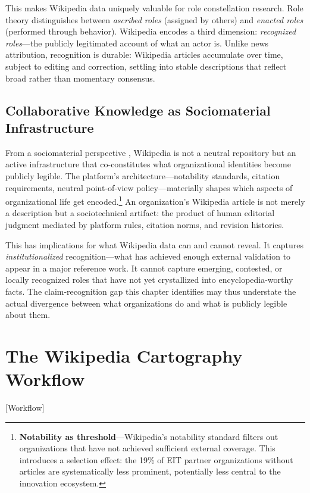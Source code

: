 \documentclass[../main.tex]{subfiles}
\begin{document}
This makes Wikipedia data uniquely valuable for role constellation research. Role theory distinguishes between \emph{ascribed roles} (assigned by others) and \emph{enacted roles} (performed through behavior). Wikipedia encodes a third dimension: \emph{recognized roles}---the publicly legitimated account of what an actor is. Unlike news attribution, recognition is durable: Wikipedia articles accumulate over time, subject to editing and correction, settling into stable descriptions that reflect broad rather than momentary consensus.

\subsection{Collaborative Knowledge as Sociomaterial Infrastructure}

From a sociomaterial perspective \parencite{orlikowski2008sociomateriality}, Wikipedia is not a neutral repository but an active infrastructure that co-constitutes what organizational identities become publicly legible. The platform's architecture---notability standards, citation requirements, neutral point-of-view policy---materially shapes which aspects of organizational life get encoded.\footnote{\textbf{Notability as threshold}---Wikipedia's notability standard filters out organizations that have not achieved sufficient external coverage. This introduces a selection effect: the 19\% of EIT partner organizations without articles are systematically less prominent, potentially less central to the innovation ecosystem.} An organization's Wikipedia article is not merely a description but a sociotechnical artifact: the product of human editorial judgment mediated by platform rules, citation norms, and revision histories.

This has implications for what Wikipedia data can and cannot reveal. It captures \emph{institutionalized} recognition---what has achieved enough external validation to appear in a major reference work. It cannot capture emerging, contested, or locally recognized roles that have not yet crystallized into encyclopedia-worthy facts. The claim-recognition gap this chapter identifies may thus understate the actual divergence between what organizations do and what is publicly legible about them.


\section{The Wikipedia Cartography Workflow}[Workflow]
\end{document}
